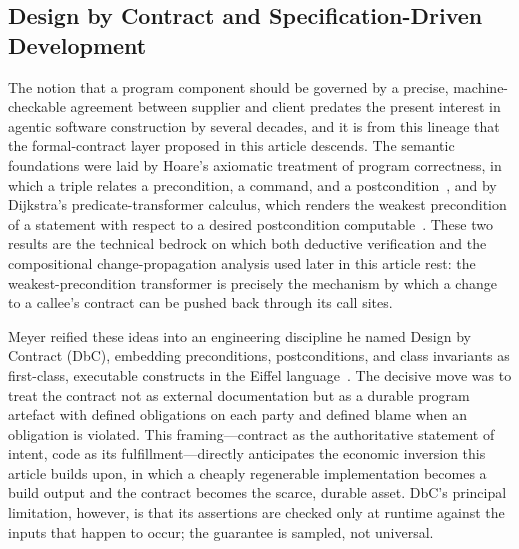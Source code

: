 \subsection{Design by Contract and Specification-Driven Development}
\label{subsec:rw2}

The notion that a program component should be governed by a precise, machine-checkable agreement between supplier and client predates the present interest in agentic software construction by several decades, and it is from this lineage that the formal-contract layer proposed in this article descends. The semantic foundations were laid by Hoare's axiomatic treatment of program correctness, in which a triple relates a precondition, a command, and a postcondition~\cite{hoare1969axiomatic}, and by Dijkstra's predicate-transformer calculus, which renders the weakest precondition of a statement with respect to a desired postcondition computable~\cite{dijkstra1976discipline}. These two results are the technical bedrock on which both deductive verification and the compositional change-propagation analysis used later in this article rest: the weakest-precondition transformer is precisely the mechanism by which a change to a callee's contract can be pushed back through its call sites.

Meyer reified these ideas into an engineering discipline he named Design by Contract (DbC), embedding preconditions, postconditions, and class invariants as first-class, executable constructs in the Eiffel language~\cite{meyer1992dbc,meyer1997oosc}. The decisive move was to treat the contract not as external documentation but as a durable program artefact with defined obligations on each party and defined blame when an obligation is violated. This framing---contract as the authoritative statement of intent, code as its fulfillment---directly anticipates the economic inversion this article builds upon, in which a cheaply regenerable implementation becomes a build output and the contract becomes the scarce, durable asset. DbC's principal limitation, however, is that its assertions are checked only at runtime against the inputs that happen to occur; the guarantee is sampled, not universal.

